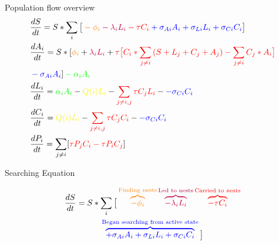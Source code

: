 \documentclass{beamer}
\makeatletter
\def\mcolor#1#{\@mcolor{#1}}
\def\@mcolor#1#2#3{%
  \protect\leavevmode
  \begingroup
    \color#1{#2}#3%
  \endgroup
}
\newcommand{\annotate}[3]{
\mcolor{#1}{\overbrace{#3}^\text{#2}}
}
\makeatother
\begin{document}
\begin{frame}{Population flow overview}
    \begin{equation}
    \begin{aligned}
         & \frac{dS}{dt} = S * \sum_i \big[\mcolor{orange}{- \phi_i} \mcolor{purple}{- \lambda_iL_i} \mcolor{red}{- \tau C_i} \mcolor{blue}{+ \sigma_{Ai}A_i + \sigma_{Li}L_i + \sigma_{Ci}C_i} \big] \\
         & \frac{dA_i}{dt} = S * [\mcolor{orange}{\phi_i} + \mcolor{purple}{\lambda_iL_i} + \mcolor{red}{\tau \big[ C_i * \sum_{j \neq i}{(S + L_j + C_j + A_j)} - \sum_{j \neq i}{C_j * A_i} \big] } \\ & \mcolor{blue}{- \sigma_{Ai}A_i}] \mcolor{green}{- \alpha_iA_i} \\
        & \frac{dL_i}{dt} = \mcolor{green}{\alpha_iA_i} - \mcolor{yellow}{Q(i)L_i} - \mcolor{red}{\sum_{j \neq i, j} \tau C_jL_i} - \mcolor{blue}{- \sigma_{Ci}C_i} \\
        & \frac{dC_i}{dt} = \mcolor{yellow}{Q(i)L_i} - \mcolor{red}{\sum_{j \neq i, j} \tau C_jC_i} - \mcolor{blue}{- \sigma_{Ci}C_i} \\
        & \frac{dP_i}{dt} = \sum_{j \neq i} [\mcolor{red}{\tau P_j C_i} \mcolor{red}{- \tau P_i C_j}] \\
    \end{aligned}
    \end{equation}

\end{frame}

\begin{frame}{Searching Equation}

\begin{multline}
    \frac{dS}{dt} = S * \sum_i \big[\annotate{orange}{Finding nests}{- \phi_i} \annotate{purple}{Led to nests}{- \lambda_iL_i} \annotate{red}{Carried to nests}{- \tau C_i} \\ 
    \annotate{blue}{Began searching from active state}{+ \sigma_{Ai}A_i + \sigma_{Li}L_i + \sigma_{Ci}C_i} \big]
\end{multline}


\end{frame}
\end{document}
